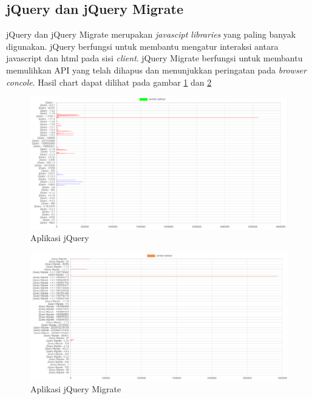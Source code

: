 \subsection{jQuery dan jQuery Migrate}
jQuery dan jQuery Migrate merupakan \textit{javascipt libraries} yang paling banyak digunakan. jQuery berfungsi untuk membantu mengatur interaksi antara javascript dan html pada sisi \textit{client}. jQuery Migrate berfungsi untuk membantu memulihkan API yang telah dihapus dan menunjukkan peringatan pada \textit{browser concole}. Hasil chart dapat dilihat pada gambar \ref{fig:data_sample_jQuery} dan  \ref{fig:data_sample_jQuery_migrate}
\begin{figure}[H]
	\centering  
	\includegraphics[scale=0.5]{Gambar/hasil_chart_jQuery.png}  
	\caption{Aplikasi jQuery} 
	\label{fig:data_sample_jQuery} 
\end{figure}

\begin{figure}[H]
	\centering  
	\includegraphics[scale=0.5]{Gambar/hasil_chart_jQuery_migrate.png}  
	\caption{Aplikasi jQuery Migrate} 
	\label{fig:data_sample_jQuery_migrate} 
\end{figure}
